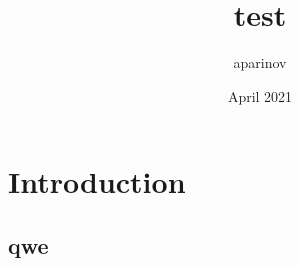 \documentclass{article}
\title{test}
\author{aparinov }
\date{April 2021}
\begin{document}
\maketitle

\section{Introduction}
\subsection{qwe}
\end{document}

